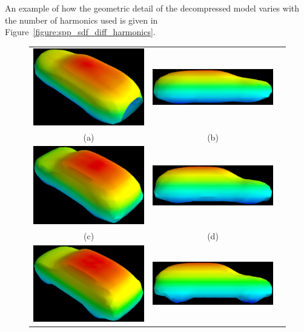 An example of how the geometric detail of the decompressed model varies with the number 
of harmonics used is given in Figure~\ref{figure:spp_sdf_diff_harmonics}.
\begin{figure}[!htbp]
  \centering
  \begin{tabular}{ccc}
    \includegraphics[width=.4\linewidth]{figures/spp/differing_harmonics/1.eps}&
		\includegraphics[width=.4\linewidth]{figures/spp/differing_harmonics/1_side.eps}\\
    (a) & (b) \\
    \includegraphics[width=.4\linewidth]{figures/spp/differing_harmonics/3.eps}&
		\includegraphics[width=.4\linewidth]{figures/spp/differing_harmonics/3_side.eps}\\
    (c) & (d) \\
    \includegraphics[width=.4\linewidth]{figures/spp/differing_harmonics/all.eps}&
		\includegraphics[width=.4\linewidth]{figures/spp/differing_harmonics/all_side.eps}\\

\end{tabular}
\end{figure}
